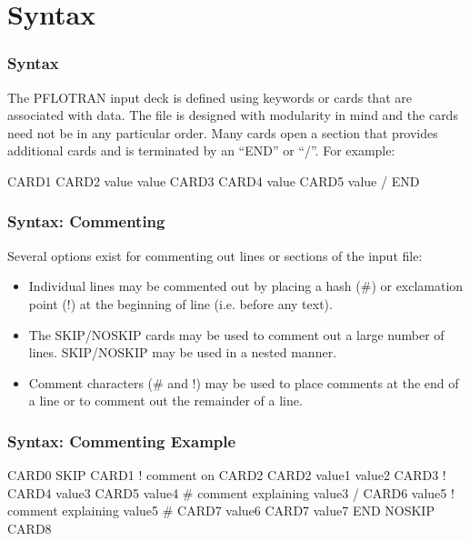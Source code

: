 \section{Syntax}

\begin{frame}[containsverbatim]\frametitle{Syntax}

The PFLOTRAN input deck is defined using keywords or cards that are associated with data.  The file is designed with modularity in mind and the cards need not be in any particular order.  Many cards open a section that provides additional cards and is terminated by an ``END'' or ``/''.  For example:

\begin{semiverbatim}
CARD1
  CARD2 value value
  CARD3
    CARD4 value
    CARD5 value
  /
END
\end{semiverbatim}

\end{frame}

\begin{frame}[fragile]\frametitle{Syntax: Commenting}
Several options exist for commenting out lines or sections of the input file:
\begin{itemize}
\item Individual lines may be commented out by placing a hash (\#) or exclamation point (!) at the beginning of line (i.e. before any text).
\item The SKIP/NOSKIP cards may be used to comment out a large number of lines.  SKIP/NOSKIP may be used in a nested manner.  
\item Comment characters (\# and !) may be used to place comments at the end of a line or to comment out the remainder of a line.
\end{itemize}

\end{frame}

\begin{frame}[containsverbatim]\frametitle{Syntax: Commenting Example}

\begin{semiverbatim}
CARD0
SKIP
CARD1
  ! comment on CARD2
  CARD2 value1 value2
  CARD3
  !  CARD4 value3 
    CARD5 value4 # comment explaining value3
  /
  CARD6 value5 ! comment explaining value5
#  CARD7 value6
  CARD7 value7
END
NOSKIP
CARD8
\end{semiverbatim}

\end{frame}

